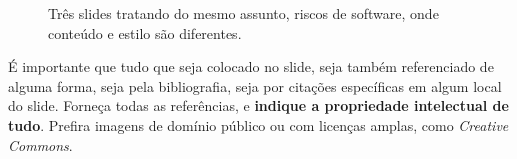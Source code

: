 \begin{figure}
    \centering
\caption{Três slides tratando do mesmo assunto, riscos de software, onde conteúdo e estilo são diferentes.}
\label{fig:tres}
\end{figure}


É importante que tudo que seja colocado no slide, seja também referenciado de alguma forma, seja pela bibliografia, seja por citações específicas em algum local do slide.
Forneça todas as referências, e \textbf{indique a propriedade intelectual de tudo}. Prefira imagens de domínio público ou com licenças amplas, como \textit{Creative Commons}.


